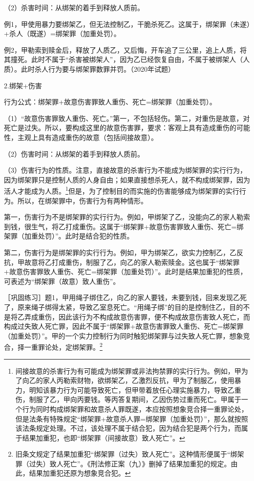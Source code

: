 （2）杀害时间：从绑架的着手到释放人质前。

例1，甲使用暴力要绑架乙，但无法控制乙，干脆杀死乙。这属于，绑架罪（未遂）+杀人（既遂）=绑架罪（加重处罚）。

例2，甲勒索到赎金后，释放了人质乙，又后悔，开车追了三公里，追上人质，将其撞死。此时不属于“杀害被绑架人”，因为乙已经恢复自由，不属于被绑架人（人质）。此时杀人行为要与绑架罪数罪并罚。（2020年试题）

2.绑架+伤害

行为公式：绑架罪+故意伤害罪致人重伤、死亡=绑架罪（加重处罚）。

（1）“故意伤害罪致人重伤、死亡。”第一，不包括轻伤。第二，对重伤是故意，对死亡是过失。所以，要构成这里的故意伤害罪，要求：客观上具有造成重伤的可能性，主观上具有造成重伤的故意（包括间接故意）。

（2）伤害时间：从绑架的着手到释放人质前。

（3）伤害行为的性质。注意，直接故意的杀害行为不能成为绑架罪的实行行为，因为绑架罪只是控制人质的人身自由；如果直接想杀死人，就不构成绑架罪，因为活人才能成为人质。\footnote{间接故意的杀害行为有可能成为绑架罪或非法拘禁罪的实行行为。例如，甲为了向乙的家人丙勒索财物，欲绑架乙，乙激烈反抗，甲为了制服乙，使用暴力，明知该暴力行为可能导致死亡，但甲带着放任心理实施暴力，导致乙重伤，制服了乙，甲向丙要钱。等丙答复期间，乙因伤势过重而死亡。甲属于一个行为同时构成绑架罪和故意杀人罪既遂，本应按照想象竞合择一重罪论处，但是法条有特殊规定“绑架罪+故意杀人罪=绑架罪（加重处罚）”，那么就按照该法条规定处理。不过，该处理不属于结合犯，因为结合犯是两个行为，而属于结果加重犯，也即“绑架罪（间接故意）致人死亡”。}但是，为了控制目的而实施的伤害能够成为绑架罪的实行行为。所以，在绑架罪中，伤害行为有两种情形。

第一，伤害行为不是绑架罪的实行行为。例如，甲绑架了乙，没能向乙的家人勒索到钱，很生气，将乙打成重伤。这属于“绑架罪+故意伤害罪致人重伤、死亡=绑架罪（加重处罚）”。此时是结合犯的性质。

第二，伤害行为是绑架罪的实行行为。例如，甲为绑架乙，欲实力控制乙，乙反抗，甲故意将乙打成重伤，制服了乙，向乙的家人勒索赎金。这也属于“绑架罪+故意伤害罪致人重伤、死亡=绑架罪（加重处罚）”。此时是结果加重犯的性质，可表述为“绑架罪（故意）致人重伤”。

［巩固练习］题1，甲用绳子绑住乙，向乙的家人要钱，未要到钱，回来发现乙死了，原来绳子绑得太紧，导致乙室息死亡。“用绳子绑”的目的是控制住乙，目的不是将乙弄成重伤，因此该行为不构成故意伤害罪，便不构成故意伤害致人死亡，而构成过失致人死亡罪，因此不属于“绑架罪+故意伤害罪致人重伤、死亡=绑架罪（加重处罚）”。甲的一个实力控制行为同时触犯绑架罪与过失致人死亡罪，想象竞合，择一重罪论处，定绑架罪。\footnote{旧条文规定了结果加重犯“绑架罪（过失）致人死亡”。这种情形便属于“绑架罪（过失）致人死亡”。《刑法修正案（九）》删掉了结果加重犯的规定。由此，结果加重犯还原为想象竞合犯。}

